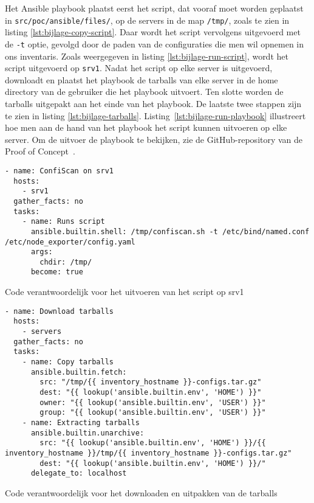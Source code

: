 Het Ansible playbook plaatst eerst het script, dat vooraf moet worden geplaatst in \texttt{src/poc/ansible/files/}, op de servers in de map \texttt{/tmp/}, zoals te zien in listing \ref{lst:bijlage-copy-script}.
Daar wordt het script vervolgens uitgevoerd met de \texttt{-t} optie, gevolgd door de paden van de configuraties die men wil opnemen in ons inventaris.
Zoals weergegeven in listing \ref{lst:bijlage-run-script}, wordt het script uitgevoerd op \texttt{srv1}.
Nadat het script op elke server is uitgevoerd, downloadt en plaatst het playbook de tarballs van elke server in de home directory van de gebruiker die het playbook uitvoert.
Ten slotte worden de tarballs uitgepakt aan het einde van het playbook.
De laatste twee stappen zijn te zien in listing \ref{lst:bijlage-tarballs}.
Listing~\ref{lst:bijlage-run-playbook} illustreert hoe men aan de hand van het playbook het script kunnen uitvoeren op elke server.
Om de uitvoer de playbook te bekijken, zie de GitHub-repository van de Proof of Concept~\autocite{github-poc}.

\begin{listing}
  \begin{verbatim}
- name: ConfiScan on srv1
  hosts:
    - srv1
  gather_facts: no
  tasks:
    - name: Runs script
      ansible.builtin.shell: /tmp/confiscan.sh -t /etc/bind/named.conf /etc/node_exporter/config.yaml
      args:
        chdir: /tmp/
      become: true
    \end{verbatim}
    \caption[Uitvoeren van script op \texttt{srv1}.]{Code verantwoordelijk voor het uitvoeren van het script op srv1}
    \label{lst:bijlage-run-script}
\end{listing}

\begin{listing}
  \begin{verbatim}
- name: Download tarballs
  hosts:
    - servers
  gather_facts: no
  tasks:
    - name: Copy tarballs
      ansible.builtin.fetch:
        src: "/tmp/{{ inventory_hostname }}-configs.tar.gz"
        dest: "{{ lookup('ansible.builtin.env', 'HOME') }}"
        owner: "{{ lookup('ansible.builtin.env', 'USER') }}"
        group: "{{ lookup('ansible.builtin.env', 'USER') }}"
    - name: Extracting tarballs
      ansible.builtin.unarchive:
        src: "{{ lookup('ansible.builtin.env', 'HOME') }}/{{ inventory_hostname }}/tmp/{{ inventory_hostname }}-configs.tar.gz"
        dest: "{{ lookup('ansible.builtin.env', 'HOME') }}/"
      delegate_to: localhost
  \end{verbatim}
  \caption[Downloaden en uitpakken van tarballs.]{Code verantwoordelijk voor het downloaden en uitpakken van de tarballs}
  \label{lst:bijlage-tarballs}
\end{listing}

